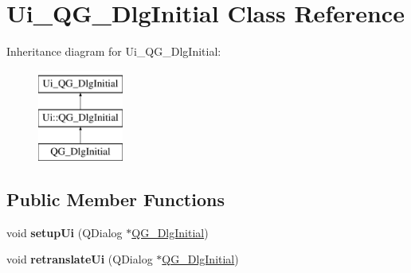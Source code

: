 \hypertarget{classUi__QG__DlgInitial}{\section{Ui\-\_\-\-Q\-G\-\_\-\-Dlg\-Initial Class Reference}
\label{classUi__QG__DlgInitial}
}
Inheritance diagram for Ui\-\_\-\-Q\-G\-\_\-\-Dlg\-Initial\-:\begin{figure}[H]
\begin{center}
\leavevmode
\includegraphics[height=3.000000cm]{classUi__QG__DlgInitial}
\end{center}
\end{figure}
\subsection*{Public Member Functions}
\begin{DoxyCompactItemize}
\item 
\hypertarget{classUi__QG__DlgInitial_a3884261fc538341c75ed9f28dc0f679f}{void {\bfseries setup\-Ui} (Q\-Dialog $\ast$\hyperlink{classQG__DlgInitial}{Q\-G\-\_\-\-Dlg\-Initial})}\label{classUi__QG__DlgInitial_a3884261fc538341c75ed9f28dc0f679f}

\item 
\hypertarget{classUi__QG__DlgInitial_a3034c18ec115a2370db8e9f9676435b4}{void {\bfseries retranslate\-Ui} (Q\-Dialog $\ast$\hyperlink{classQG__DlgInitial}{Q\-G\-\_\-\-Dlg\-Initial})}\label{classUi__QG__DlgInitial_a3034c18ec115a2370db8e9f9676435b4}

\end{DoxyCompactItemize}

